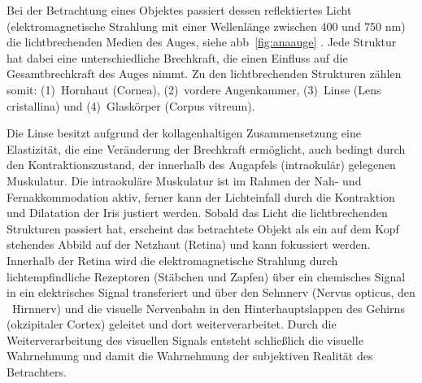 Bei der Betrachtung eines Objektes passiert dessen reflektiertes Licht (elektromagnetische Strahlung mit einer Wellenlänge zwischen 400 und 750 nm) die lichtbrechenden Medien des Auges, siehe \acs{abb}~\ref{fig:anaauge} \cite{Bondke2014}. Jede Struktur hat dabei eine unterschiedliche Brechkraft, die einen Einfluss auf die Gesamtbrechkraft des Auges nimmt. Zu den lichtbrechenden Strukturen zählen somit: (1)~Hornhaut (Cornea), (2)~vordere Augenkammer, (3)~Linse (Lens cristallina) und (4)~Glaskörper (Corpus vitreum).

Die Linse besitzt aufgrund der kollagenhaltigen Zusammensetzung eine Elastizität, die eine Veränderung der Brechkraft ermöglicht, auch bedingt durch den Kontraktionszustand, der innerhalb des Augapfels (intraokulär) gelegenen Muskulatur. Die intraokuläre Muskulatur ist im Rahmen der Nah- und Fernakkommodation aktiv, ferner kann der Lichteinfall durch die Kontraktion und Dilatation der Iris justiert werden. Sobald das Licht die lichtbrechenden Strukturen passiert hat, erscheint das betrachtete Objekt als ein auf dem Kopf stehendes Abbild auf der Netzhaut (Retina) und kann fokussiert werden. Innerhalb der Retina wird die elektromagnetische Strahlung durch lichtempfindliche Rezeptoren (Stäbchen und Zapfen) über ein chemisches Signal in ein elektrisches Signal transferiert und über den Sehnnerv (Nervus opticus, den ~Hirnnerv) und die visuelle Nervenbahn in den Hinterhauptslappen des Gehirns (okzipitaler Cortex) geleitet und dort weiterverarbeitet. Durch die Weiterverarbeitung des visuellen Signals entsteht schließlich die visuelle Wahrnehmung und damit die Wahrnehmung der subjektiven Realität des Betrachters. 

